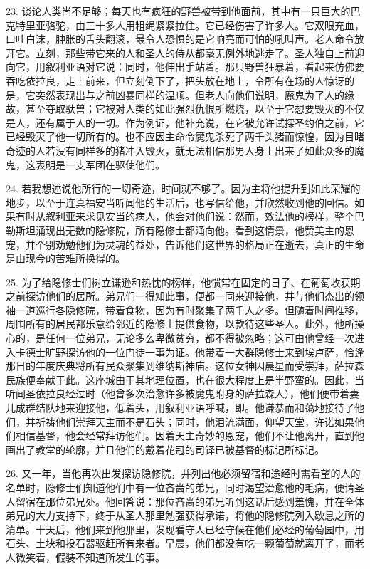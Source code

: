 23. 谈论人类尚不足够；每天也有疯狂的野兽被带到他面前，其中有一只巨大的巴克特里亚骆驼，由三十多人用粗绳紧紧拉住。它已经伤害了许多人。它双眼充血，口吐白沫，肿胀的舌头翻滚，最令人恐惧的是它响亮而可怕的吼叫声。老人命令放开它。立刻，那些带它来的人和圣人的侍从都毫无例外地逃走了。圣人独自上前迎向它，用叙利亚语对它说：同时，他伸出手站着。那只野兽狂暴着，看起来仿佛要吞吃依拉良，走上前来，但立刻倒下了，把头放在地上，令所有在场的人惊讶的是，它突然表现出与之前凶暴同样的温顺。但老人向他们说明，魔鬼为了人的缘故，甚至夺取驮兽；它被对人类的如此强烈仇恨所燃烧，以至于它想要毁灭的不仅是人，还有属于人的一切。作为例证，他补充说，在它被允许试探圣约伯之前，它已经毁灭了他一切所有的。也不应因主命令魔鬼杀死了两千头猪而惊惶，因为目睹奇迹的人若没有同样多的猪冲入毁灭，就无法相信那男人身上出来了如此众多的魔鬼，这表明是一支军团在驱使他们。\par

24. 若我想述说他所行的一切奇迹，时间就不够了。因为主将他提升到如此荣耀的地步，以至于连真福安当听闻他的生活后，也写信给他，并欣然收到他的回信。如果有时从叙利亚来求见安当的病人，他会对他们说：然而，效法他的榜样，整个巴勒斯坦涌现出无数的隐修院，所有隐修士都涌向他。看到这情景，他赞美主的恩宠，并个别劝勉他们为灵魂的益处，告诉他们这世界的格局正在逝去，真正的生命是由现今的苦难所换得的。\par

25. 为了给隐修士们树立谦逊和热忱的榜样，他惯常在固定的日子、在葡萄收获期之前探访他们的居所。弟兄们一得知此事，便都一同来迎接他，并与他们杰出的领袖一道巡行各隐修院，带着食物，因为有时聚集了两千人之多。但随着时间推移，周围所有的居民都乐意给邻近的隐修士提供食物，以款待这些圣人。此外，他所操心的，是任何一位弟兄，无论多么卑微贫穷，都不得被忽略；这可由他曾经一次进入卡德士旷野探访他的一位门徒一事为证。他带着一大群隐修士来到埃卢萨，恰逢那日的年度庆典将所有民众聚集到维纳斯神庙。这位女神因晨星而受崇拜，萨拉森民族便奉献于此。这座城由于其地理位置，也在很大程度上是半野蛮的。因此，当听闻圣依拉良经过时（他曾多次治愈许多被魔鬼附身的萨拉森人），他们便带着妻儿成群结队地来迎接他，低着头，用叙利亚语呼喊，即。他谦恭而和蔼地接待了他们，并祈祷他们崇拜天主而不是石头；同时，他泪流满面，仰望天堂，许诺如果他们相信基督，他会经常拜访他们。因着天主奇妙的恩宠，他们不让他离开，直到他画出了教堂的轮廓，并且他们的戴着花冠的司铎已被基督的标记所标记。\par

26. 又一年，当他再次出发探访隐修院，并列出他必须留宿和途经时需看望的人的名单时，隐修士们知道他们中有一位吝啬的弟兄，同时渴望治愈他的毛病，便请圣人留宿在那位弟兄处。他回答说：那位吝啬的弟兄听到这话后感到羞愧，并在全体弟兄的大力支持下，终于从圣人那里勉强获得承诺，将他的隐修院列入歇息之所的清单。十天后，他们来到他那里，发现看守人已经守候在他们必经的葡萄园中，用石头、土块和投石器驱赶所有来者。早晨，他们都没有吃一颗葡萄就离开了，而老人微笑着，假装不知道所发生的事。\par

